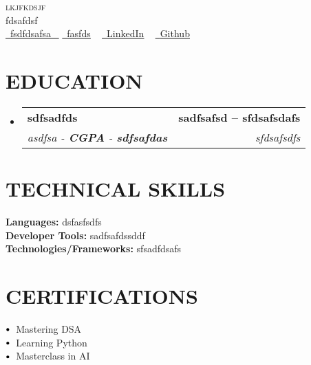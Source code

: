 \documentclass[letterpaper,11pt]{article}
\makeatletter
\newcommand{\resumeSubheading}[4]{
  \vspace{-2pt}\item
    \begin{tabular*}{1.0\textwidth}[t]{l@{\extracolsep{\fill}}r}
      \textbf{\large#1} & \textbf{\small #2} \\
      \textit{\large#3} & \textit{\small #4} \\
     
    \end{tabular*}\vspace{-7pt}
}
\newcommand{\resumeSubHeadingListStart}{\begin{itemize}[leftmargin=0.0in, label={}]}
\newcommand{\resumeSubHeadingListEnd}{\end{itemize}}
\newcommand\sbullet[1][.5]{\mathbin{\vcenter{\hbox{\scalebox{#1}{$\bullet$}}}}}
\makeatother
\begin{document}

\begin{center}
    {\Huge \scshape lkjfkdsjf} \\ \vspace{1pt}
    fdsafdsf \\ \vspace{1pt}
    \small 
    \small \href{fsdfdsafsa}{ \raisebox{-0.1\height}\faPhone\ \underline{fsdfdsafsa} ~} 
    \href{fasfds}{\raisebox{-0.2\height}\faEnvelope\  \underline{fasfds}} ~
    \href{sadfsa}{\raisebox{-0.2\height}\faLinkedinSquare\ \underline{LinkedIn}}  ~
    \href{asdfdasfsd}{\raisebox{-0.2\height}\faGithub\ \underline{Github}} ~
\end{center}

\section{EDUCATION}
  \resumeSubHeadingListStart
    \resumeSubheading
      {sdfsadfds}{sadfsafsd -- sfdsafsdafs}
      {asdfsa - \textbf{CGPA} - \textbf{sdfsafdas} }{sfdsafsdfs}
  \resumeSubHeadingListEnd
\section{TECHNICAL SKILLS}
 \begin{itemize}[leftmargin=0.15in, label={}]
    \small{\item{
     \textbf{\normalsize{Languages:}}{ \normalsize{dsfasfsdfs}} \\
     \textbf{\normalsize{Developer Tools:}}{ \normalsize{sadfsafdssddf}} \\
     \textbf{\normalsize{Technologies/Frameworks:}}{\normalsize{ sfsadfdsafs}} \\
    }}
 \end{itemize}
 \vspace{-15pt}


%     

\section{CERTIFICATIONS}
$\sbullet[.75] \hspace{0.1cm}$ Mastering DSA \\
$\sbullet[.75] \hspace{0.1cm}$ Learning Python \\
$\sbullet[.75] \hspace{0.1cm}$ Masterclass in AI \\
\end{document}
